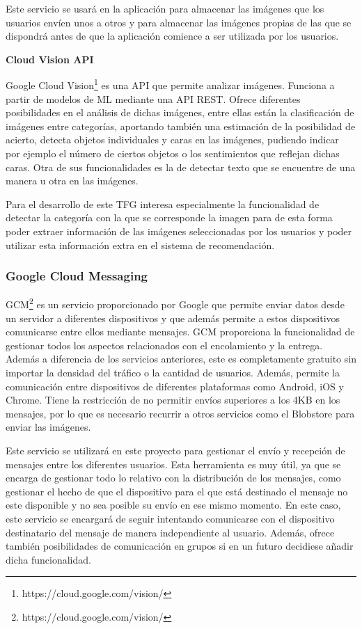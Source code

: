Este servicio se usará en la aplicación para almacenar las imágenes que los usuarios envíen unos a otros y para almacenar las imágenes propias de las que se dispondrá antes de que la aplicación comience a ser utilizada por los usuarios.

\textbf{Cloud Vision API}

Google Cloud Vision\footnote{https://cloud.google.com/vision/} es una \acs{API} que permite analizar imágenes. Funciona a partir de modelos de \acf{ML} mediante una \acs{API} \acs{REST}. Ofrece diferentes posibilidades en el análisis de dichas imágenes, entre ellas están la clasificación de imágenes entre categorías, aportando también una estimación de la posibilidad de acierto, detecta objetos individuales y caras en las imágenes, pudiendo indicar por ejemplo el número de ciertos objetos o los sentimientos que reflejan dichas caras. Otra de sus funcionalidades es la de detectar texto que se encuentre de una manera u otra en las imágenes.

Para el desarrollo de este \ac{TFG} interesa especialmente la funcionalidad de detectar la categoría con la que se corresponde la imagen para de esta forma poder extraer información de las imágenes seleccionadas por los usuarios y poder utilizar esta información extra en el sistema de recomendación.


\subsubsection{Google Cloud Messaging}
\ac{GCM}\footnote{https://cloud.google.com/vision/} es un servicio proporcionado por Google que permite enviar datos desde un servidor a diferentes dispositivos y que además permite a estos dispositivos comunicarse entre ellos mediante mensajes. \ac{GCM} proporciona la funcionalidad de gestionar todos los aspectos relacionados con el encolamiento y la entrega. Además a diferencia de los servicios anteriores, este es completamente gratuito sin importar la densidad del tráfico o la cantidad de usuarios. Además, permite la comunicación entre dispositivos de diferentes plataformas como Android, iOS y Chrome. Tiene la restricción de no permitir envíos superiores a los 4KB en los mensajes, por lo que es necesario recurrir a otros servicios como el Blobstore para enviar las imágenes.

Este servicio se utilizará en este proyecto para gestionar el envío y recepción de mensajes entre los diferentes usuarios. Esta herramienta es muy útil, ya que se encarga de gestionar todo lo relativo con la distribución de los mensajes, como gestionar el hecho de que el dispositivo para el que está destinado el mensaje no este disponible y no sea posible su envío en ese mismo momento. En este caso, este servicio se encargará de seguir intentando comunicarse con el dispositivo destinatario del mensaje de manera independiente al usuario. Además, ofrece también posibilidades de comunicación en grupos si en un futuro decidiese añadir dicha funcionalidad.

